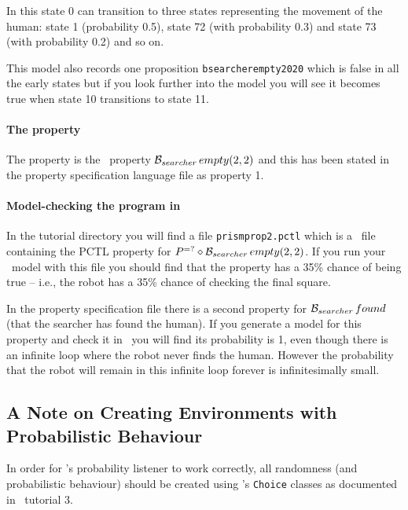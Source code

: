 In this state 0 can transition to three states representing the movement of the human: state 1 (probability 0.5), state 72 (with probability 0.3) and state 73 (with probability 0.2) and so on.

This model also records one proposition \texttt{bsearcherempty2020} which is false in all the early states but if you look further into the model you will see it becomes true when state 10 transitions to state 11.

\paragraph{The property} The property is the \ajpf\ property $\mathrm{{\cal B}}_{searcher} \, empty(2, 2)$ and this has been stated in the property specification language file as property 1. 

\paragraph{Model-checking the program in \prism}  In the tutorial directory you will find a file \texttt{prismprop2.pctl} which is a \prism\ file containing the PCTL property for $P^{=?}\diamond \mathrm{{\cal B}}_{searcher} \, empty(2, 2)$.  If you run your \prism\ model with this file you should find that the property has a 35\% chance of being true -- i.e., the robot has a 35\% chance of checking the final square.

In the property specification file there is a second property for $\mathrm{{\cal B}}_{searcher} \, found$ (that the searcher has found the human).  If you generate a model for this property and check it in \prism\ you will find its probability is 1, even though there is an infinite loop where the robot never finds the human.   However the probability that the robot will remain in this infinite loop forever is infinitesimally small.

\subsection{A Note on Creating Environments with Probabilistic Behaviour}

In order for \ajpf's probability listener to work correctly, all randomness (and probabilistic behaviour) should be created using \ail's \texttt{Choice} classes as documented in \ail\ tutorial 3.  

